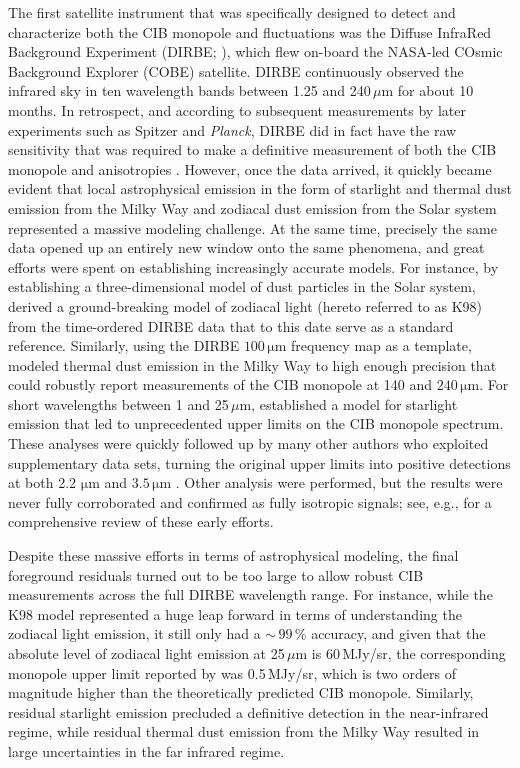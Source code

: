 \documentclass{aa}
\def\Planck{\textit{Planck}}
\begin{document}
The first satellite instrument that was specifically designed to detect and characterize both the CIB monopole and fluctuations was the Diffuse InfraRed Background Experiment (DIRBE; \citealp{hauser1998}), which flew on-board the NASA-led COsmic Background Explorer (COBE) satellite. DIRBE continuously observed the infrared sky in ten wavelength bands between 1.25 and 240\,$\mu\mathrm{m}$ for about 10 months. In retrospect, and according to subsequent measurements by later experiments such as Spitzer and \Planck, DIRBE did in fact have the raw sensitivity that was required to make a definitive measurement of both the CIB monopole and anisotropies \citep{boggess92,hauser1998}. However, once the data arrived, it quickly became evident that local astrophysical emission in the form of starlight and thermal dust emission from the Milky Way and zodiacal dust emission from the Solar system represented a massive modeling challenge. At the same time, precisely the same data opened up an entirely new window onto the same phenomena, and great efforts were spent on establishing increasingly accurate models. For instance, by establishing a three-dimensional model of dust particles in the Solar system, \citet{kelsall1998} derived a ground-breaking model of zodiacal light (hereto referred to as K98) from the time-ordered DIRBE data that to this date serve as a standard reference. Similarly, using the DIRBE $100\,\mathrm{\mu m}$ frequency map as a template, \citet{arendt1998} modeled thermal dust emission in the Milky Way to high enough precision that \citet{hauser1998} could robustly report measurements of the CIB monopole at 140 and $240\,\mathrm{\mu m}$. For short wavelengths between 1 and 25$\,\mu\mathrm{m}$, \citet{arendt1998} established a model for starlight emission that led to unprecedented upper limits on the CIB monopole spectrum. These analyses were quickly followed up by many other authors who exploited supplementary data sets, turning the original upper limits into positive detections at both 2.2 $\mathrm{\mu m}$ \citep{wright:2000,gorjian:2000,wright:2001} and $3.5\,\mathrm{\mu m}$ \citep{dwek:1998b,gorjian:2000,wright:2000}. Other analysis were performed, but the results were never fully corroborated and confirmed as fully isotropic signals; see, e.g., \citet{hauser:2001} for a comprehensive review of these early efforts.

Despite these massive efforts in terms of astrophysical modeling, the final foreground residuals turned out to be too large to allow robust CIB measurements across the full DIRBE wavelength range. For instance, while the K98 model represented a huge leap forward in terms of understanding the zodiacal light emission, it still only had a $\sim$\,$99\,\%$ accuracy, and given that the absolute level of zodiacal light emission at 25$\,\mu\mathrm{m}$ is 60\,MJy/sr, the corresponding monopole upper limit reported by \citet{hauser1998} was 0.5\,MJy/sr, which is two orders of magnitude higher than the theoretically predicted CIB monopole. Similarly, residual starlight emission precluded a definitive detection in the near-infrared regime, while residual thermal dust emission from the Milky Way resulted in large uncertainties in the far infrared regime. 
\end{document}
